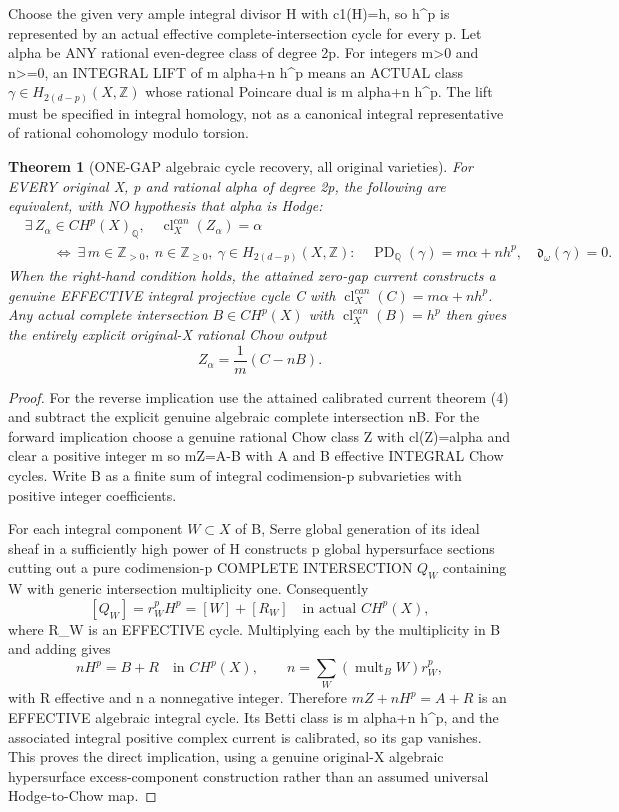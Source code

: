 \documentclass[11pt]{article}
\newtheorem{theorem}{Theorem}[section]
\begin{document}
Choose the given very ample integral
divisor H with c1(H)=h, so h^p
is represented by an actual effective
complete-intersection cycle
for every p. Let alpha be ANY rational
even-degree class of degree 2p.
For integers m>0 and n>=0, an INTEGRAL LIFT of
m alpha+n h^p means an ACTUAL class
\(\gamma\in H_{2(d-p)}(X,\mathbb Z)\)
whose rational Poincare dual is m alpha+n h^p.
The lift must be specified in integral homology,
not as a canonical integral representative of
rational cohomology modulo torsion.

\begin{theorem}[ONE-GAP algebraic cycle recovery, all original varieties]
For EVERY original X, p and rational
alpha of degree 2p, the following
are equivalent, with NO hypothesis
that alpha is Hodge:
\[
 \boxed{
 \begin{split}
 &\exists\,Z_\alpha\in CH^p(X)_{\mathbb Q},
   \quad\operatorname{cl}^{can}_X(Z_\alpha)=\alpha\\
 &\qquad\Longleftrightarrow\
 \exists\,m\in\mathbb Z_{>0},\
 n\in\mathbb Z_{\ge0},\
 \gamma\in H_{2(d-p)}(X,\mathbb Z):
 \quad\operatorname{PD}_{\mathbb Q}(\gamma)=m\alpha+n h^p,
 \quad\mathfrak d_\omega(\gamma)=0.
 \end{split}
 }                                                       \tag{8}
\]
When the right-hand condition holds,
the attained zero-gap current constructs
a genuine EFFECTIVE integral projective
cycle C with
\(\operatorname{cl}^{can}_X(C)=m\alpha+n h^p\).
Any actual complete intersection
\(B\in CH^p(X)\) with
\(\operatorname{cl}^{can}_X(B)=h^p\)
then gives the entirely explicit
original-X rational Chow output
\[
 \boxed{Z_\alpha=\frac1m(C-nB).}               \tag{9}
\]
\end{theorem}
\begin{proof}
For the reverse implication use
the attained calibrated current
theorem (4) and subtract the
explicit genuine algebraic
complete intersection nB.
For the forward implication choose
a genuine rational Chow class Z
with cl(Z)=alpha and clear a
positive integer m so
mZ=A-B with A and B effective
INTEGRAL Chow cycles. Write
B as a finite sum of integral
codimension-p subvarieties
with positive integer coefficients.

For each integral component
\(W\subset X\) of B, Serre
global generation of its ideal
sheaf in a sufficiently high
power of H constructs p
global hypersurface sections
cutting out a pure
codimension-p COMPLETE
INTERSECTION \(Q_W\)
containing W with generic
intersection multiplicity one.
Consequently
\[
 [Q_W]=r_W^pH^p=[W]+[R_W]
       \quad\text{in actual }CH^p(X),
\]
where R_W is an EFFECTIVE
cycle. Multiplying each by
the multiplicity in B and
adding gives
\[
 nH^p=B+R
 \quad\text{in }CH^p(X),
 \qquad n=\sum_W
       (\operatorname{mult}_B W)r_W^p,
\]
with R effective and n a
nonnegative integer.
Therefore
\(mZ+nH^p=A+R\)
is an EFFECTIVE
algebraic integral cycle.
Its Betti class is
m alpha+n h^p, and the
associated integral positive
complex current is calibrated,
so its gap vanishes.
This proves the direct implication,
using a genuine original-X
algebraic hypersurface
excess-component construction
rather than an assumed universal
Hodge-to-Chow map.
\end{proof}
\end{document}
